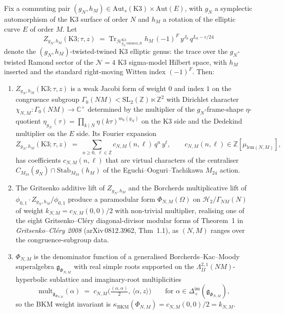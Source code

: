 \begin{conjecture}
\label{conj:gn-hm-twisted-twined-k3-genus-borcherds-lift}
\ClaimStatusConjectured
Fix a commuting pair $(g_N, h_M) \in \mathrm{Aut}_s(\mathrm{K3})
\times \mathrm{Aut}(E)$, with $g_N$ a symplectic automorphism of
the K3 surface of order $N$ and $h_M$ a rotation of the elliptic
curve $E$ of order $M$. Let
\[
 Z_{g_N, h_M}(\mathrm{K3}; \tau, z)
 \;=\;
 \mathrm{Tr}_{\mathscr H^{\mathrm{K3}}_{g_N\text{-twisted}, R}}\;
 h_M\,(-1)^F\, y^{J_0}\, q^{L_0 - c/24}
\]
denote the $(g_N, h_M)$-twisted-twined K3 elliptic genus: the
trace over the $g_N$-twisted Ramond sector of the
$\mathcal N = 4$ K3 sigma-model Hilbert space, with $h_M$
inserted and the standard right-moving Witten index
$(-1)^F$. Then:
\begin{enumerate}
\item $Z_{g_N, h_M}(\mathrm{K3}; \tau, z)$ is a weak Jacobi form
of weight $0$ and index $1$ on the congruence subgroup
$\Gamma_0(NM) < \mathrm{SL}_2(\mathbb Z) \ltimes
\mathbb Z^2$ with Dirichlet character
$\chi_{N,M}: \Gamma_0(NM) \to \mathbb C^\times$ determined by
the multiplier of the $g_N$-frame-shape $\eta$-quotient
$\eta_{g_N}(\tau) = \prod_{k \mid N} \eta(k\tau)^{m_k(g_N)}$ on
the K3 side and the Dedekind multiplier on the $E$ side. Its
Fourier expansion
\[
 Z_{g_N, h_M}(\mathrm{K3}; \tau, z)
 \;=\;
 \sum_{n \ge 0,\; \ell \in \mathbb Z}
 c_{N, M}(n, \ell)\,
 q^n\, y^\ell,
 \qquad c_{N, M}(n, \ell)\in\mathbb Z[\mu_{\mathrm{lcm}(N,M)}],
\]
has coefficients $c_{N, M}(n, \ell)$ that are virtual
characters of the centraliser
$C_{M_{24}}(g_N) \cap \mathrm{Stab}_{M_{24}}(h_M)$ of the
Eguchi--Ooguri--Tachikawa $M_{24}$ action.

\item The Gritsenko additive lift of $Z_{g_N, h_M}$ and the
Borcherds multiplicative lift of $\phi_{0,1} \cdot
Z_{g_N, h_M}/\phi_{0,1}$ produce a paramodular form
$\Phi_{N, M}(\Omega)$ on $\mathcal H_2 / \Gamma_{NM}(N)$ of
weight $k_{N, M} = c_{N, M}(0, 0)/2$ with non-trivial
multiplier, realising one of the eight Gritsenko--Cl\'ery
diagonal-divisor modular forms of
Theorem~\textup{1} in \textit{Gritsenko--Cl\'ery 2008}
\textup{(}arXiv\,0812.3962, Thm~\textup{1.1}\textup{)}, as
$(N, M)$ ranges over the congruence-subgroup data.

\item $\Phi_{N, M}$ is the denominator function of a generalised
Borcherds--Kac--Moody superalgebra
$\mathfrak g_{\Phi_{N, M}}$ with real simple roots supported on
the $\Lambda^{2,1}_{II}(NM)$-hyperbolic sublattice and
imaginary-root multiplicities
\[
 \mathrm{mult}_{\mathfrak g_{\Phi_{N, M}}}(\alpha)
 \;=\;
 c_{N, M}\!\Big(\tfrac{(\alpha,\alpha)}{2},\,\langle\alpha, z\rangle\Big)
 \qquad \text{for } \alpha \in \Delta^{\mathrm{im}}_+(\mathfrak g_{\Phi_{N, M}}),
\]
so the BKM weight invariant is
$\kappa_{\mathrm{BKM}}(\Phi_{N, M}) = c_{N, M}(0, 0)/2 =
k_{N, M}$.


\end{enumerate}
\end{conjecture}
